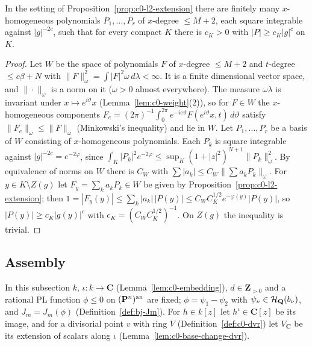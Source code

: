 \begin{corollary}\label{cor:c0-bergman-lower}
\leanok
{}
In the setting of Proposition~\ref{prop:c0-l2-extension} there are finitely many $x$-homogeneous polynomials $P_1,\dots,P_r$ of
$x$-degree $\le M+2$, each square integrable against $|g|^{-2c}$, such that for every compact $K$ there is $c_K>0$ with
$|P|\ge c_K|g|^c$ on $K$.
\end{corollary}

\begin{proof}
Let $W$ be the space of polynomials $F$ of $x$-degree $\le M+2$ and $t$-degree $\le c\beta+N$ with $\|F\|_\omega^2=\int|F|^2\omega\,d\lambda<\infty$. It is a
finite dimensional vector space, and $\|\cdot\|_\omega$ is a norm on it ($\omega>0$ almost everywhere). The measure $\omega\lambda$ is invariant under
$x\mapsto e^{i\vartheta}x$ (Lemma~\ref{lem:c0-weight}(2)), so for $F\in W$ the $x$-homogeneous components
$F_e=(2\pi)^{-1}\int_0^{2\pi}e^{-ie\vartheta}F(e^{i\vartheta}x,t)\,d\vartheta$ satisfy $\|F_e\|_\omega\le\|F\|_\omega$ (Minkowski's inequality) and lie in $W$. Let
$P_1,\dots,P_r$ be a basis of $W$ consisting of $x$-homogeneous polynomials. Each $P_k$ is square integrable against $|g|^{-2c}=e^{-2\varphi}$,
since $\int_K|P_k|^2e^{-2\varphi}\le\sup_K(1+|z|^2)^{N+1}\|P_k\|_\omega^2$. By equivalence of norms on $W$ there is $C_W$ with
$\sum|a_k|\le C_W\|\sum a_kP_k\|_\omega$. For $y\in K\setminus Z(g)$ let $F_y=\sum_ka_kP_k\in W$ be given by Proposition~\ref{prop:c0-l2-extension}; then
$1=|F_y(y)|\le\sum_k|a_k|\,|P(y)|\le C_WC_K^{1/2}e^{-\varphi(y)}|P(y)|$, so $|P(y)|\ge c_K|g(y)|^c$ with $c_K=(C_WC_K^{1/2})^{-1}$. On $Z(g)$ the
inequality is trivial.
\end{proof}

\subsection{Assembly}

In this subsection $k$, $\iota\colon k\to\mathbf C$ (Lemma~\ref{lem:c0-embedding}), $d\in\mathbf Z_{>0}$ and a rational PL function $\phi\le0$ on
$(\mathbf{P}^n)^{\mathrm{an}}$ are fixed; $\phi=\psi_1-\psi_2$ with $\psi_\nu\in\mathcal H_{\mathbf{Q}}(b_\nu)$, and $J_m=J_m(\phi)$ (Definition~\ref{def:bj-Jm}). For
$h\in k[z]$ let $h^\iota\in\mathbf C[z]$ be its image, and for a divisorial point $v$ with ring $V$ (Definition~\ref{def:c0-dvr}) let $V_{\mathbf C}$
be its extension of scalars along $\iota$ (Lemma~\ref{lem:c0-base-change-dvr}).

